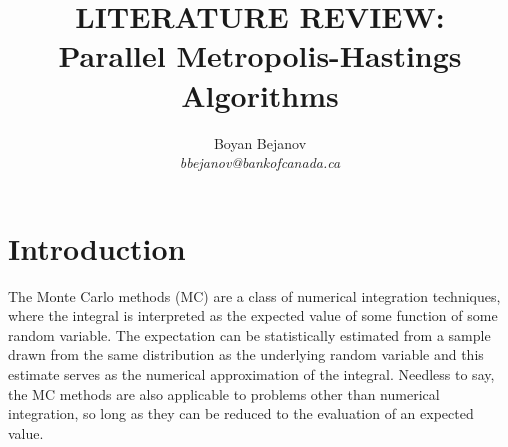 \documentclass[11pt]{article}       %
\begin{document}


\title{LITERATURE REVIEW: \\
  Parallel Metropolis-Hastings Algorithms
}


\author{
Boyan Bejanov\\
{\em bbejanov@bankofcanada.ca}
} %

\maketitle



\section{Introduction} \label{intro}

The Monte Carlo methods (MC) are a class of numerical integration techniques,
where the integral is interpreted as the expected value of some function of
some random variable.  The expectation can be statistically estimated from a
sample drawn from the same distribution as the underlying random variable and
this estimate serves as the numerical approximation of the integral.  Needless
to say, the MC methods are also applicable to problems other than numerical
integration, so long as they can be reduced to the evaluation of an expected
value.  
\end{document}
